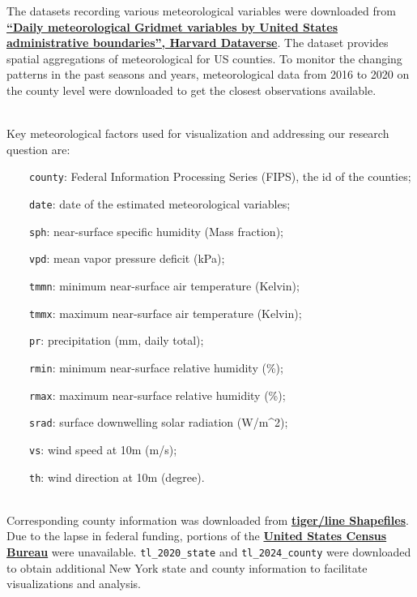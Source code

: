 \documentclass[
]{article}
\begin{document}
The datasets recording various meteorological variables were downloaded
from \textbf{\href{https://doi.org/10.7910/DVN/FYTME3}{``Daily
meteorological Gridmet variables by United States administrative
boundaries'', Harvard Dataverse}}. The dataset provides spatial
aggregations of meteorological for US counties. To monitor the changing
patterns in the past seasons and years, meteorological data from 2016 to
2020 on the county level were downloaded to get the closest observations
available.\\
\strut \\
Key meteorological factors used for visualization and addressing our
research question are:\\
\strut ~~~~\texttt{county}: Federal Information Processing Series
(FIPS), the id of the counties;\\
\strut ~~~~\texttt{date}: date of the estimated meteorological
variables;\\
\strut ~~~~\texttt{sph}: near-surface specific humidity (Mass
fraction);\\
\strut ~~~~\texttt{vpd}: mean vapor pressure deficit (kPa);\\
\strut ~~~~\texttt{tmmn}: minimum near-surface air temperature
(Kelvin);\\
\strut ~~~~\texttt{tmmx}: maximum near-surface air temperature
(Kelvin);\\
\strut ~~~~\texttt{pr}: precipitation (mm, daily total);\\
\strut ~~~~\texttt{rmin}: minimum near-surface relative humidity (\%);\\
\strut ~~~~\texttt{rmax}: maximum near-surface relative humidity (\%);\\
\strut ~~~~\texttt{srad}: surface downwelling solar radiation
(W/m\^{}2);\\
\strut ~~~~\texttt{vs}: wind speed at 10m (m/s);\\
\strut ~~~~\texttt{th}: wind direction at 10m (degree).\\
\strut \\
Corresponding county information was downloaded from
\textbf{\href{https://www.census.gov/cgi-bin/geo/shapefiles/index.php}{tiger/line
Shapefiles}}. Due to the lapse in federal funding, portions of the
\textbf{\href{https://www.census.gov/}{United States Census Bureau}}
were unavailable. \texttt{tl\_2020\_state} and \texttt{tl\_2024\_county}
were downloaded to obtain additional New York state and county
information to facilitate visualizations and analysis.\\
\end{document}
